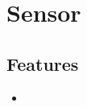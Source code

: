 \section{Sensor}
\label{module:Sensor}
\AvailableInJavaOnly{\TODO}
\subsection{Features}
\begin{itemize}
	\item \TODO
\end{itemize}
